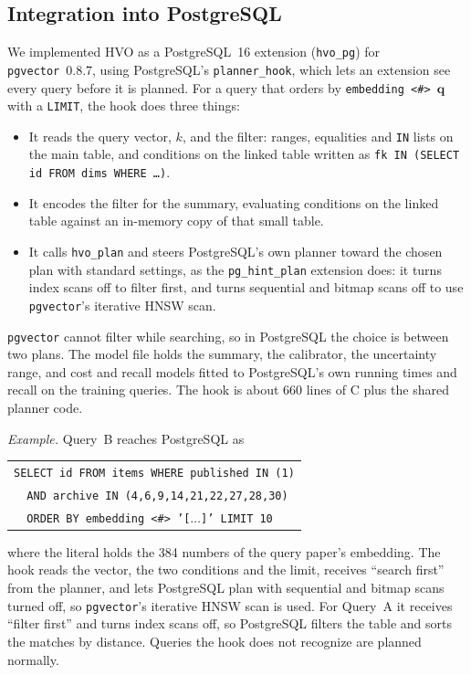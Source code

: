 \documentclass[sigconf,nonacm]{acmart}
\begin{document}
\subsection{Integration into PostgreSQL}\label{sec:pg}
We implemented HVO as a PostgreSQL~16 extension (\texttt{hvo\_pg}) for \texttt{pgvector}~0.8.7, using PostgreSQL's \texttt{planner\_hook}, which lets an extension see every query before it is planned. For a query that orders by \texttt{embedding <\#> $\mathbf{q}$} with a \texttt{LIMIT}, the hook does three things:
\begin{itemize}
    \item It reads the query vector, $k$, and the filter: ranges, equalities and \texttt{IN} lists on the main table, and conditions on the linked table written as \texttt{fk IN (SELECT id FROM dims WHERE \ldots)}.
    \item It encodes the filter for the summary, evaluating conditions on the linked table against an in-memory copy of that small table.
    \item It calls \texttt{hvo\_plan} and steers PostgreSQL's own planner toward the chosen plan with standard settings, as the \texttt{pg\_hint\_plan} extension does: it turns index scans off to filter first, and turns sequential and bitmap scans off to use \texttt{pgvector}'s iterative HNSW scan.
\end{itemize}
\texttt{pgvector} cannot filter while searching, so in PostgreSQL the choice is between two plans. The model file holds the summary, the calibrator, the uncertainty range, and cost and recall models fitted to PostgreSQL's own running times and recall on the training queries. The hook is about 660 lines of C plus the shared planner code.

\emph{Example.} Query~B reaches PostgreSQL as
\begin{center}
\footnotesize
\begin{tabular}{@{}l@{}}
\texttt{SELECT id FROM items WHERE published IN (1)}\\
\texttt{\ \ AND archive IN (4,6,9,14,21,22,27,28,30)}\\
\texttt{\ \ ORDER BY embedding <\#> '[$\ldots$]' LIMIT 10}
\end{tabular}
\end{center}
where the literal holds the 384 numbers of the query paper's embedding. The hook reads the vector, the two conditions and the limit, receives ``search first'' from the planner, and lets PostgreSQL plan with sequential and bitmap scans turned off, so \texttt{pgvector}'s iterative HNSW scan is used. For Query~A it receives ``filter first'' and turns index scans off, so PostgreSQL filters the table and sorts the matches by distance. Queries the hook does not recognize are planned normally.
\end{document}
